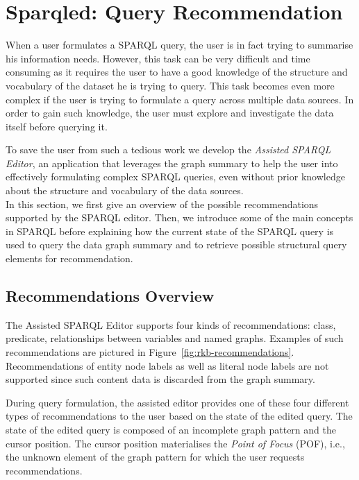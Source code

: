 \section{Sparqled: Query Recommendation}
\label{sec:exploiting:sparqled:recommendation}

When a user formulates a SPARQL query, the user is in fact trying to summarise his information needs. However, this task can be very difficult and time consuming as it requires the user to have a good knowledge of the structure and vocabulary of the dataset he is trying to query. This task becomes even more complex if the user is trying to formulate a query across multiple data sources. In order to gain such knowledge, the user must explore and investigate the data itself before querying it.

To save the user from such a tedious work we develop the \emph{Assisted SPARQL Editor}, an application that leverages the graph summary to help the user into effectively formulating complex SPARQL queries, even without prior knowledge about the structure and vocabulary of the data sources.\\

In this section, we first give an overview of the possible recommendations supported by the SPARQL editor. Then, we introduce some of the main concepts in SPARQL before explaining how the current state of the SPARQL query is used to query the data graph summary and to retrieve possible structural query elements for recommendation.

\subsection{Recommendations Overview}

The Assisted SPARQL Editor supports four kinds of recommendations: class, predicate, relationships between variables and named graphs. Examples of such recommendations are pictured in Figure~\ref{fig:rkb-recommendations}. Recommendations of entity node labels as well as literal node labels are not supported since such content data is discarded from the graph summary.

During query formulation, the assisted editor provides one of these four different types of recommendations to the user based on the state of the edited query. The state of the edited query is composed of an incomplete graph pattern and the cursor position. The cursor position materialises the \emph{Point of Focus} (POF), i.e., the unknown element of the graph pattern for which the user requests recommendations.

